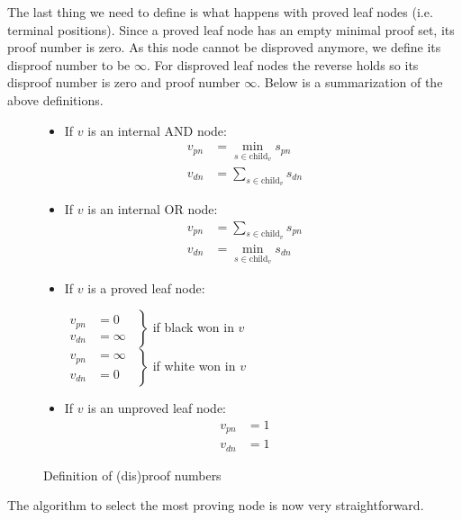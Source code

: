 \documentclass{article}
\begin{document}
The last thing we need to define is what happens with proved leaf nodes (i.e. terminal positions). Since a proved leaf node has an empty minimal proof set,
its proof number is zero. As this node cannot be disproved anymore, we define its disproof number to be $\infty$. For disproved leaf nodes the reverse holds
so its disproof number is zero and proof number $\infty$. Below is a summarization of the above definitions.
\begin{figure}
\begin{itemize}
  \item If $v$ is an internal AND node:
    \begin{align*}
      v_{pn} &= \min_{s \in \text{child}_v} s_{pn}\\
      v_{dn} &= \sum_{s \in \text{child}_v} s_{dn}
    \end{align*}
  \item If $v$ is an internal OR node:
    \begin{align*}
      v_{pn} &= \sum_{s \in \text{child}_v} s_{pn}\\
      v_{dn} &= \min_{s \in \text{child}_v} s_{dn}
    \end{align*}
  \item If $v$ is a proved leaf node:\\
    \begin{center}
      $\left.
      \begin{aligned}
        v_{pn} &= 0 \quad \\
        v_{dn} &= \infty
      \end{aligned}
      \right\}$ if black won in $v$\\
      \hspace{0.7mm}$\left.
      \begin{aligned}
        v_{pn} &= \infty \\
        v_{dn} &= 0 \quad
      \end{aligned}
      \right\}$ if white won in $v$
    \end{center}
  \item If $v$ is an unproved leaf node:
    \begin{align*}
      v_{pn} &= 1 \\
      v_{dn} &= 1
    \end{align*}
\end{itemize}
\label{pn:def}
\caption{Definition of (dis)proof numbers}
\end{figure}

The algorithm to select the most proving node is now very straightforward.
\end{document}
